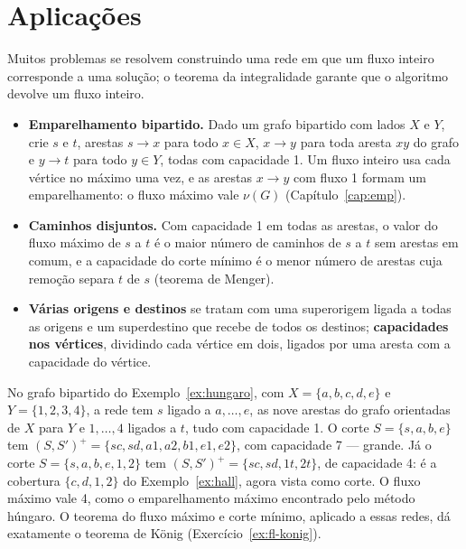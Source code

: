 \section{Aplicações}\label{sec:fluxoaplic}
Muitos problemas se resolvem construindo uma rede em que um fluxo inteiro corresponde a uma solução; o teorema da integralidade garante que o algoritmo devolve um fluxo inteiro.
\begin{itemize}
  \item \textbf{Emparelhamento bipartido.} Dado um grafo bipartido com lados $X$ e $Y$, crie $s$ e $t$, arestas $s\to x$ para todo $x\in X$, $x\to y$ para toda aresta $xy$ do grafo e $y\to t$ para todo $y\in Y$, todas com capacidade 1. Um fluxo inteiro usa cada vértice no máximo uma vez, e as arestas $x\to y$ com fluxo 1 formam um emparelhamento: o fluxo máximo vale $\nu(G)$ (Capítulo~\ref{cap:emp}).
  \item \textbf{Caminhos disjuntos.} Com capacidade 1 em todas as arestas, o valor do fluxo máximo de $s$ a $t$ é o maior número de caminhos de $s$ a $t$ sem arestas em comum, e a capacidade do corte mínimo é o menor número de arestas cuja remoção separa $t$ de $s$ (teorema de Menger).
  \item \textbf{Várias origens e destinos} se tratam com uma superorigem ligada a todas as origens e um superdestino que recebe de todos os destinos; \textbf{capacidades nos vértices}, dividindo cada vértice em dois, ligados por uma aresta com a capacidade do vértice.
\end{itemize}

\begin{exemplo}\label{ex:fluxoemp}
No grafo bipartido do Exemplo~\ref{ex:hungaro}, com $X=\{a,b,c,d,e\}$ e $Y=\{1,2,3,4\}$, a rede tem $s$ ligado a $a,\dots,e$, as nove arestas do grafo orientadas de $X$ para $Y$ e $1,\dots,4$ ligados a $t$, tudo com capacidade 1. O corte $S=\{s,a,b,e\}$ tem $(S,S')^+=\{sc,sd,a1,a2,b1,e1,e2\}$, com capacidade 7 --- grande. Já o corte $S=\{s,a,b,e,1,2\}$ tem $(S,S')^+=\{sc,sd,1t,2t\}$, de capacidade 4: é a cobertura $\{c,d,1,2\}$ do Exemplo~\ref{ex:hall}, agora vista como corte. O fluxo máximo vale 4, como o emparelhamento máximo encontrado pelo método húngaro. O teorema do fluxo máximo e corte mínimo, aplicado a essas redes, dá exatamente o teorema de König (Exercício~\ref{ex:fl-konig}).
\end{exemplo}

